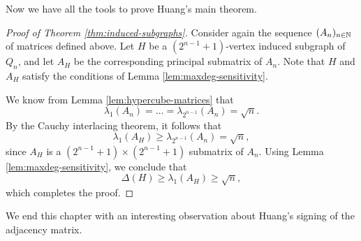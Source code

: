 Now we have all the tools to prove Huang's main theorem.
\begin{proof}[Proof of Theorem \ref{thm:induced-subgraphs}]
    Consider again the sequence $(A_n)_{n \in \mathbb{N}}$ of matrices defined above.
    Let $H$ be a $(2^{n - 1} + 1)$-vertex induced subgraph of $Q_n$, and let $A_H$ be the corresponding principal submatrix of $A_n$. 
    Note that $H$ and $A_H$ satisfy the conditions of Lemma \ref{lem:maxdeg-sensitivity}.
    
    We know from Lemma \ref{lem:hypercube-matrices} that 
    \begin{equation*}
        \lambda_1 (A_n) = \dots = \lambda_{2^{n - 1}}(A_n) = \sqrt{n}.
    \end{equation*}
    By the Cauchy interlacing theorem, it follows that
    \begin{equation*}
        \lambda_1 (A_H) \ge \lambda_{2^{n - 1}} (A_n) = \sqrt{n},
    \end{equation*}
    since $A_H$ is a $(2^{n - 1} + 1) \times (2^{n - 1} + 1)$ submatrix of $A_n$.
    Using Lemma \ref{lem:maxdeg-sensitivity}, we conclude that
    \begin{equation*}
        \Delta(H) \ge \lambda_1 (A_H) \ge \sqrt{n},
    \end{equation*}
    which completes the proof.
\end{proof}

We end this chapter with an interesting observation about Huang's signing of the adjacency matrix.

